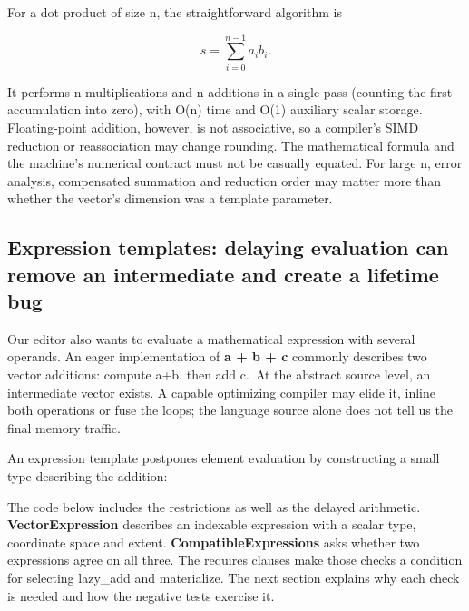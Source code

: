 For a dot product of size n, the straightforward algorithm is

\[
s=\sum_{i=0}^{n-1}a_i b_i.
\]

It performs n multiplications and n additions in a single pass (counting the first accumulation into zero), with O(n) time and O(1) auxiliary scalar storage. Floating-point addition, however, is not associative, so a compiler's SIMD reduction or reassociation may change rounding. The mathematical formula and the machine's numerical contract must not be casually equated. For large n, error analysis, compensated summation and reduction order may matter more than whether the vector's dimension was a template parameter.

\subsection{Expression templates: delaying evaluation can remove an intermediate and create a lifetime bug}\label{05-engine-i-ch007-expression-templates-delaying-evaluation-can-remove-an-intermediate-and-create-a-lifetime-bug}

Our editor also wants to evaluate a mathematical expression with several operands. An eager implementation of \textbf{a + b + c} commonly describes two vector additions: compute a+b, then add c.~At the abstract source level, an intermediate vector exists. A capable optimizing compiler may elide it, inline both operations or fuse the loops; the language source alone does not tell us the final memory traffic.

An expression template postpones element evaluation by constructing a small type describing the addition:

The code below includes the restrictions as well as the delayed arithmetic. \textbf{VectorExpression} describes an indexable expression with a scalar type, coordinate space and extent. \textbf{CompatibleExpressions} asks whether two expressions agree on all three. The requires clauses make those checks a condition for selecting lazy\_add and materialize. The next section explains why each check is needed and how the negative tests exercise it.

